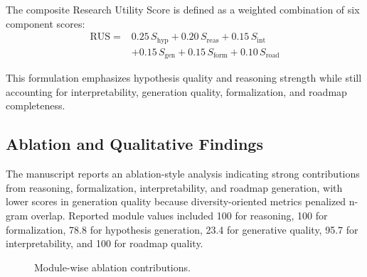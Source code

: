 \documentclass[conference]{IEEEtran}
\begin{document}
The composite Research Utility Score is defined as a weighted combination of six component scores:
\begin{equation}
\begin{aligned}
\mathrm{RUS} = {}&0.25\,S_{\mathrm{hyp}} + 0.20\,S_{\mathrm{reas}} + 0.15\,S_{\mathrm{int}} \\
&+ 0.15\,S_{\mathrm{gen}} + 0.15\,S_{\mathrm{form}} + 0.10\,S_{\mathrm{road}}
\end{aligned}
\label{eq:rus}
\end{equation}

This formulation emphasizes hypothesis quality and reasoning strength while still accounting for interpretability, generation quality, formalization, and roadmap completeness.

\subsection{Ablation and Qualitative Findings}
The manuscript reports an ablation-style analysis indicating strong contributions from reasoning, formalization, interpretability, and roadmap generation, with lower scores in generation quality because diversity-oriented metrics penalized n-gram overlap. Reported module values included 100 for reasoning, 100 for formalization, 78.8 for hypothesis generation, 23.4 for generative quality, 95.7 for interpretability, and 100 for roadmap quality.

\begin{figure}[htbp]
\centering
{}
\caption{Module-wise ablation contributions.}
\label{fig:ablation}
\end{figure}
\end{document}
